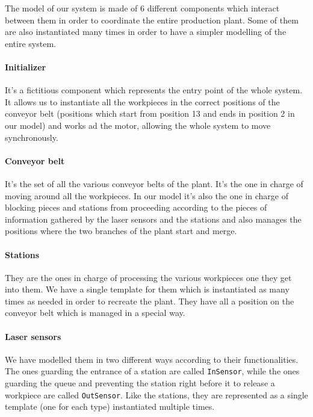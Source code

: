 \documentclass[a4paper]{article}
\begin{document}
    The model of our system is made of 6 different components which interact between them in order to coordinate the entire production plant. Some of them are also instantiated many times in order to have a simpler modelling of the entire system.

    \paragraph{Initializer} It's a fictitious component which represents the entry point of the whole system. It allows us to instantiate all the workpieces in the correct positions of the conveyor belt (positions which start from position 13 and ends in position 2 in our model) and works ad the motor, allowing the whole system to move synchronously.

    \paragraph{Conveyor belt} It's the set of all the various conveyor belts of the plant. It's the one in charge of moving around all the workpieces. In our model it's also the one in charge of blocking pieces and stations from proceeding according to the pieces of information gathered by the laser sensors and the stations and also manages the positions where the two branches of the plant start and merge.

    \paragraph{Stations} They are the ones in charge of processing the various workpieces one they get into them. We have a single template for them which is instantiated as many times as needed in order to recreate the plant. They have all a position on the conveyor belt which is managed in a special way.

    \paragraph{Laser sensors} We have modelled them in two different ways according to their functionalities. The ones guarding the entrance of a station are called \texttt{InSensor}, while the ones guarding the queue and preventing the station right before it to release a workpiece are called \texttt{OutSensor}. Like the stations, they are represented as a single template (one for each type) instantiated multiple times.
\end{document}
